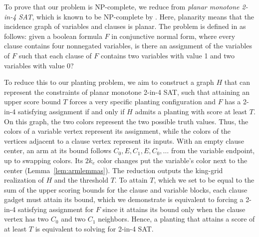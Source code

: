 \documentclass[11pt]{article}
\theoremstyle{plain}
\begin{document}
To prove that our problem is NP-complete, we reduce from \emph{planar monotone 2-in-4 SAT}, which is known to be NP-complete by \citet [Theorem~21, p.~337]{scheffler2022distance}. Here, planarity means that the incidence graph of variables and clauses is planar. The problem is defined in \citet [p.~336] {scheffler2022distance} as follows: given a boolean formula $F$ in conjunctive normal form, where every clause contains four nonnegated variables, is there an assignment of the variables of $F$ such that each clause of $F$ contains two variables with value 1 and two variables with value 0? 

To reduce this to our planting problem, we aim to construct a graph $H$ that can represent the constraints of planar monotone 2-in-4 SAT, such that attaining an upper score bound $T$ forces a very specific planting configuration and $F$ has a 2-in-4 satisfying assignment if and only if $H$ admits a planting with score at least $T$. On this graph, the two colors represent the two possible truth values. Thus, the colors of a variable vertex represent its assignment, while the colors of the vertices adjacent to a clause vertex represent its inputs. With an empty clause center, an arm at its bound follows $C_0, E, C_1, E, C_0, \ldots$ from the variable endpoint, up to swapping
colors. Its $2k_e$ color changes put the variable's color next to
the center (Lemma~\ref{lem:armlemmas}). The reduction outputs the
king-grid realization of $H$ and the threshold $T$. To attain $T$, which we set to be equal to the sum of the upper scoring bounds for the clause and variable blocks, each clause gadget must attain its bound, which we demonstrate is equivalent to forcing a 2-in-4 satisfying assignment for $F$ since it attains its bound only when the clause vertex has two $C_0$ and two $C_1$ neighbors. Hence, a planting that attains a score of at least $T$ is equivalent to solving for 2-in-4 SAT.
\end{document}
